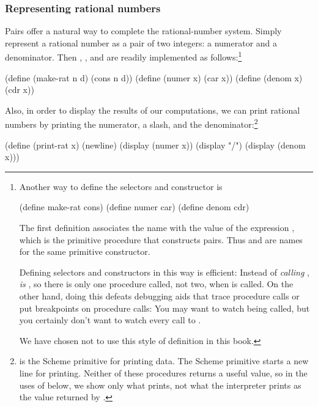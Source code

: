 \subsubsection*{Representing rational numbers}

Pairs offer a natural way to complete the rational-number system.  Simply
represent a rational number as a pair of two integers: a numerator and a
denominator.  Then , , and  are readily
implemented as follows:\footnote{Another way to define the selectors and
constructor is

\begin{compactCodeBlock}
(define make-rat cons)
(define numer car)
(define denom cdr)
\end{compactCodeBlock}

The first definition associates the name  with the value of the
expression , which is the primitive procedure that constructs pairs.
Thus  and  are names for the same primitive
constructor.

Defining selectors and constructors in this way is efficient: Instead of
 \emph{calling} ,  \emph{is}
, so there is only one procedure called, not two, when
 is called.  On the other hand, doing this defeats debugging
aids that trace procedure calls or put breakpoints on procedure calls: You may
want to watch  being called, but you certainly don't want to
watch every call to .

We have chosen not to use this style of definition in this book.}

\begin{codeBlock}
(define (make-rat n d) (cons n d))
(define (numer x) (car x))
(define (denom x) (cdr x))
\end{codeBlock}

\noindent
Also, in order to display the results of our computations, we can print
rational numbers by printing the numerator, a slash, and the
denominator:\footnote{ is the Scheme primitive for printing data.
The Scheme primitive  starts a new line for printing.  Neither of
these procedures returns a useful value, so in the uses of 
below, we show only what  prints, not what the interpreter
prints as the value returned by .}

\begin{codeBlock}
(define (print-rat x)
  (newline)
  (display (numer x))
  (display "/")
  (display (denom x)))
\end{codeBlock}

